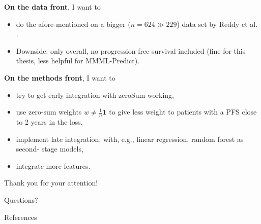 \documentclass[10pt, aspectratio=169]{beamer}
\begin{document}
\begin{frame}{}
  \textbf{On the data front}, I want to  
  \begin{itemize}
    \item do the afore-mentioned on a \alert{bigger ($n = 624 \gg 229$) data set} by Reddy 
      et al. \autocite{reddy17}. 
    \item Downside: only overall, no progression-free survival included (fine 
      for this thesis, less helpful for MMML-Predict).
  \end{itemize}

  \pause
  \textbf{On the methods front}, I want to 
  \begin{itemize}
    \item try to get \alert{early integration} with zeroSum working,
    \item use zero-sum weights $w \neq \frac{1}{n} \mathbf{1}$ to give less weight to patients with 
      a PFS close to 2 years in the loss,
    \item implement \alert{late integration}: with, e.g., linear regression, random forest as second-
      stage models,
    \item integrate more features.
  \end{itemize}
\end{frame}

\begin{frame}[standout]
  Thank you for your attention! \par Questions?
\end{frame}

\appendix

\begin{frame}[allowframebreaks]{References}
  \printbibliography
\end{frame}
\end{document}
